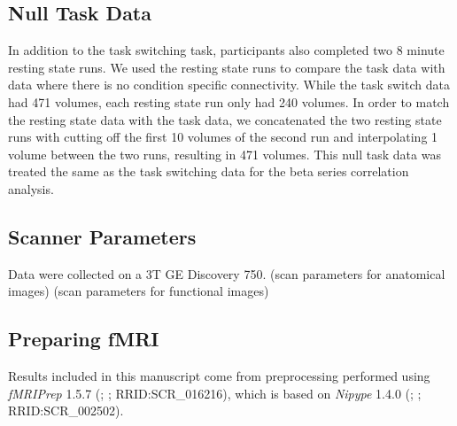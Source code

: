 \documentclass[10pt,letterpaper]{article}
\begin{document}
\subsection*{Null Task Data}
In addition to the task switching task, participants also completed
two 8 minute resting state runs.
We used the resting state runs to compare the task data with data where there is no
condition specific connectivity.
While the task switch data had 471 volumes, each resting state run only had
240 volumes.
In order to match the resting state data with the task data, we concatenated
the two resting state runs with cutting off the first 10 volumes of the second run
and interpolating 1 volume between the two runs, resulting in 471 volumes.
This null task data was treated the same as the task switching data for the
beta series correlation analysis.

\subsection{Scanner Parameters}
Data were collected on a 3T GE Discovery 750.
(scan parameters for anatomical images)
(scan parameters for functional images)


\subsection{Preparing fMRI}
Results included in this manuscript come from preprocessing performed
using \emph{fMRIPrep} 1.5.7 (\cite{fmriprep1}; \cite{fmriprep2}; RRID:SCR\_016216),
which is based on \emph{Nipype} 1.4.0
(\cite{nipype1}; \cite{nipype2}; RRID:SCR\_002502).
\end{document}
